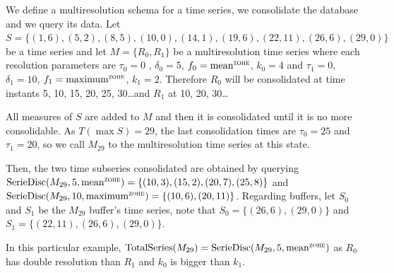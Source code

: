 \begin{example}\label{ex:model:smultiresolution} 
  We define a multiresolution schema for a time series, we consolidate
  the database and we query its data.  Let $S = \{
  (1,6),(5,2),\allowbreak (8,5),\allowbreak (10,0),\allowbreak
  (14,1),\allowbreak (19,6),\allowbreak (22,11),\allowbreak
  (26,6),(29,0) \}$ be a time series and let $M=\{R_0,R_1\}$ be a
  multiresolution time series where each resolution parameters are
  $\tau_0=0$ , $\delta_0=5$, $f_0 =\meanz$, $k_0=4$ and $\tau_1=0$,
  $\delta_1=10$, $f_1 =\maxz$, $k_1=2$. Therefore $R_0$ will be
  consolidated at time instants 5, 10, 15, 20, 25, 30\dots and $R_1$
  at 10, 20, 30\dots

  All measures of $S$ are added to $M$
  and then it is consolidated until it is no more consolidable. As
  $T(\max S)=29$, the last consolidation times are $\tau_0=25$ and
  $\tau_1=20$, so we call $M_{29}$ to the multiresolution time series
  at this state.

  Then, the two time subseries consolidated are obtained by querying
  $\seriedisc(M_{29},5,\allowbreak \meanz)=\{\allowbreak
  (10,3),\allowbreak (15,\allowbreak 2),\allowbreak (20,7),\allowbreak
  (25,8)\}$ and $\seriedisc(M_{29},\allowbreak 10,\allowbreak \maxz)
  =\allowbreak \{ \allowbreak (10,6),\allowbreak (20,11)\}$. Regarding
  buffers, let $S_0$ and $S_1$ be the $M_{29}$ buffer's time series,
  note that $S_0= \{\allowbreak (26,6),\allowbreak (29,0)\allowbreak
  \}$ and $S_1=\{\allowbreak (22,11),\allowbreak (26,6),(29,0)\}$.

  In this particular example,
  $ \totalseries(M_{29}) = \seriedisc(M_{29},\allowbreak 5,\meanz)$ as $R_0$ has
  double resolution than $R_1$ and $k_0$ is bigger than $k_1$. 
\end{example}





